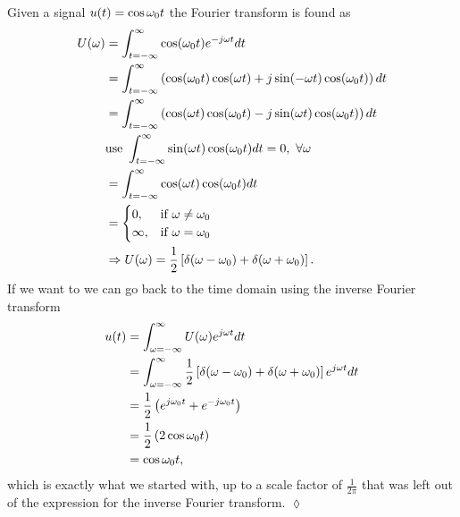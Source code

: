 \begin{example}
Given a signal $u(t)=\cos\omega_0 t$ the Fourier transform is found as
\begin{align*}
U(\omega) &= \int_{t=-\infty}^\infty \cos(\omega_0 t)e^{-j\omega t}dt \\
&= \int_{t=-\infty}^\infty \left(\cos(\omega_0 t)\cos(\omega t) + j\sin(-\omega t)\cos(\omega_0 t)\right)dt \\
&= \int_{t=-\infty}^\infty \left(\cos(\omega t)\cos(\omega_0 t) - j\sin(\omega t)\cos(\omega_0 t)\right)dt \\
&\text{use }\int_{t=-\infty}^\infty \sin(\omega t)\cos(\omega_0 t)dt = 0, ~ \forall \omega \\
&= \int_{t=-\infty}^\infty \cos(\omega t)\cos(\omega_0 t)dt \\
&= \begin{cases} 0, & \text{if } \omega \neq \omega_0 \\ \infty, & \text{if } \omega = \omega_0 \end{cases} \\
&\Rightarrow U(\omega) = \frac{1}{2} \left[\delta(\omega-\omega_0) + \delta(\omega+\omega_0)\right].
\end{align*}
If we want to we can go back to the time domain using the inverse Fourier transform
\begin{align*}
u(t) &= \int_{\omega=-\infty}^\infty U(\omega)e^{j\omega t}dt \\
&= \int_{\omega=-\infty}^\infty \frac{1}{2} \left[\delta(\omega-\omega_0) + \delta(\omega+\omega_0)\right] e^{j\omega t}dt \\
&= \frac{1}{2}\left(e^{j\omega_0 t} + e^{-j\omega_0 t}\right) \\
&= \frac{1}{2}\left(2\cos\omega_0 t\right) \\
&= \cos\omega_0 t,
\end{align*}
which is exactly what we started with, up to a scale factor of $\frac{1}{2\pi}$ that was left out of the expression for the inverse Fourier transform.
$\lozenge$
\end{example}

